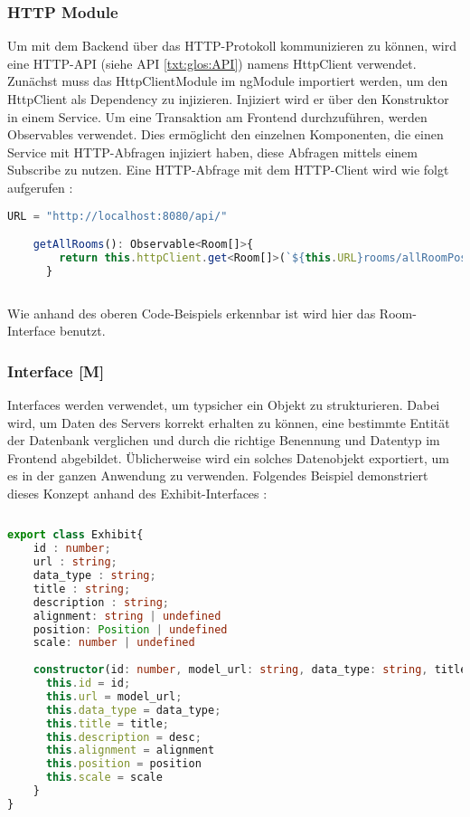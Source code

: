 \subsubsection{HTTP Module}
Um mit dem Backend über das HTTP-Protokoll kommunizieren zu können, wird eine HTTP-API (siehe API \ref{txt:glos:API}) namens HttpClient verwendet. Zunächst muss das HttpClientModule im ngModule importiert werden, um den HttpClient als Dependency zu injizieren. Injiziert wird er über den Konstruktor in einem Service. Um eine Transaktion am Frontend durchzuführen, werden Observables verwendet. Dies ermöglicht den einzelnen Komponenten, die einen Service mit HTTP-Abfragen injiziert haben, diese Abfragen mittels einem Subscribe zu nutzen. Eine HTTP-Abfrage mit dem HTTP-Client wird wie folgt aufgerufen \cite{AngularBuch} \cite{AngularHTTPClient}:

\begin{lstlisting}[caption={HttpClient Abfragen},  language=TypeScript,label=lst:impl:httpclientrequests]   
    URL = "http://localhost:8080/api/"

    getAllRooms(): Observable<Room[]>{
        return this.httpClient.get<Room[]>(`${this.URL}rooms/allRoomPositions`);
      }
    
\end{lstlisting}

Wie anhand des oberen Code-Beispiels erkennbar ist wird hier das Room-Interface benutzt.

\subsubsection{Interface [M]}
\label{interface}
Interfaces werden verwendet, um typsicher ein Objekt zu strukturieren. Dabei wird, um Daten des Servers korrekt erhalten zu können, eine bestimmte Entität der Datenbank verglichen und durch die richtige Benennung und Datentyp im Frontend abgebildet. Üblicherweise wird ein solches Datenobjekt exportiert, um es in der ganzen Anwendung zu verwenden. Folgendes Beispiel demonstriert dieses Konzept anhand des Exhibit-Interfaces \cite{AngularBuch}: 

\begin{lstlisting}[caption={Das Datenmodell eines Ausstelungsstückes},  language=TypeScript,label=lst:impl:httpclientrequests]   
  
export class Exhibit{
    id : number;
    url : string;
    data_type : string;
    title : string;
    description : string;
    alignment: string | undefined
    position: Position | undefined
    scale: number | undefined
  
    constructor(id: number, model_url: string, data_type: string, title: string, desc: string, alignment: string | undefined, position: Position | undefined, scale: number | undefined) {
      this.id = id;
      this.url = model_url;
      this.data_type = data_type;
      this.title = title;
      this.description = desc;
      this.alignment = alignment
      this.position = position
      this.scale = scale
    }
}
\end{lstlisting}

